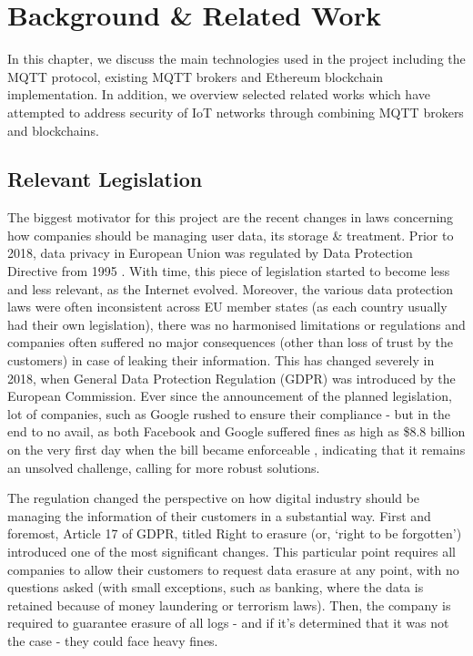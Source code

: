 \chapter{Background \& Related Work}

In this chapter, we discuss the main technologies used in the project including the MQTT protocol, existing MQTT brokers and Ethereum blockchain implementation. In addition, we overview selected related works which have attempted to address security of IoT networks through combining MQTT brokers and blockchains.
\section{Relevant Legislation}
The biggest motivator for this project are the recent changes in laws concerning how companies should be managing user data, its storage \& treatment. Prior to 2018, data privacy in European Union was regulated by Data Protection Directive from 1995 \cite{directive199595}. With time, this piece of legislation started to become less and less relevant, as the Internet evolved. Moreover, the various data protection laws were often inconsistent across EU member states (as each country usually had their own legislation), there was no harmonised limitations or regulations and companies often suffered no major consequences (other than loss of trust by the customers) in case of leaking their information. This has changed severely in 2018, when General Data Protection Regulation (GDPR) \cite{EUdataregulations2018} was introduced by the European Commission. Ever since the announcement of the planned legislation, lot of companies, such as Google rushed to ensure their compliance - but in the end to no avail, as both Facebook and Google suffered fines as high as \$8.8 billion on the very first day when the bill became enforceable \citep{brandom2018facebook}, indicating that it remains an unsolved challenge, calling for more robust solutions.

The regulation changed the perspective on how digital industry should be managing the information of their customers in a substantial way. First and foremost, Article 17 of GDPR, titled Right to erasure (or, `right to be forgotten') introduced one of the most significant changes. This particular point requires all companies to allow their customers to request data erasure at any point, with no questions asked (with small exceptions, such as banking, where the data is retained because of money laundering or terrorism laws). Then, the company is required to guarantee erasure of all logs - and if it's determined that it was not the case - they could face heavy fines.


